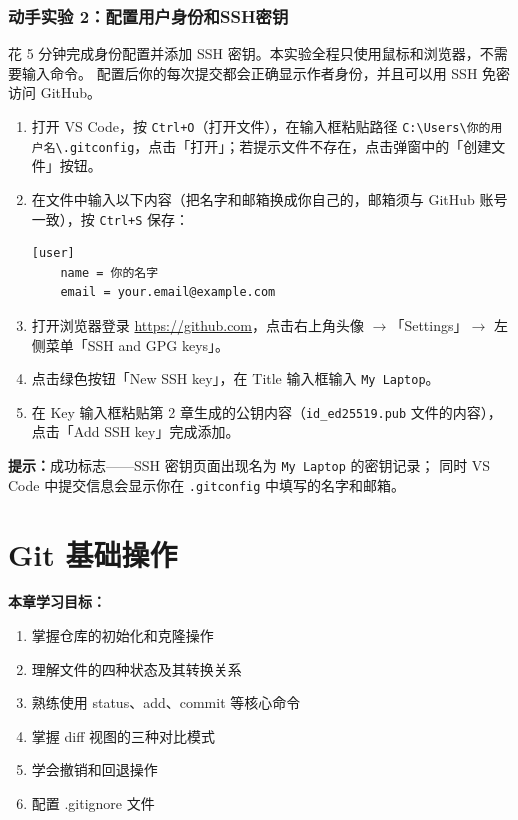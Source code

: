\documentclass[12pt,a4paper,openany]{ctexbook}
\begin{document}
\subsection*{动手实验 2：配置用户身份和SSH密钥}

花 5 分钟完成身份配置并添加 SSH 密钥。本实验全程只使用鼠标和浏览器，不需要输入命令。
配置后你的每次提交都会正确显示作者身份，并且可以用 SSH 免密访问 GitHub。

\medskip
\begin{enumerate}[leftmargin=1.5em]
  \item 打开 VS Code，按 \texttt{Ctrl+O}（打开文件），在输入框粘贴路径 \texttt{C:\textbackslash Users\textbackslash 你的用户名\textbackslash .gitconfig}，点击「打开」；若提示文件不存在，点击弹窗中的「创建文件」按钮。
  \item 在文件中输入以下内容（把名字和邮箱换成你自己的，邮箱须与 GitHub 账号一致），按 \texttt{Ctrl+S} 保存：
\begin{lstlisting}[style=shell]
[user]
	name = 你的名字
	email = your.email@example.com
\end{lstlisting}
  \item 打开浏览器登录 \url{https://github.com}，点击右上角头像 $\to$「Settings」$\to$ 左侧菜单「SSH and GPG keys」。
  \item 点击绿色按钮「New SSH key」，在 Title 输入框输入 \texttt{My Laptop}。
  \item 在 Key 输入框粘贴第 2 章生成的公钥内容（\texttt{id\_ed25519.pub} 文件的内容），点击「Add SSH key」完成添加。
\end{enumerate}
\medskip

\medskip
\noindent\textbf{提示：}成功标志——SSH 密钥页面出现名为 \texttt{My Laptop} 的密钥记录；
同时 VS Code 中提交信息会显示你在 \texttt{.gitconfig} 中填写的名字和邮箱。
\medskip

\chapter{Git 基础操作}

\medskip
\noindent\textbf{本章学习目标：}
\begin{enumerate}[leftmargin=1.5em]
  \item 掌握仓库的初始化和克隆操作
  \item 理解文件的四种状态及其转换关系
  \item 熟练使用 status、add、commit 等核心命令
  \item 掌握 diff 视图的三种对比模式
  \item 学会撤销和回退操作
  \item 配置 .gitignore 文件
\end{enumerate}
\medskip
\end{document}
